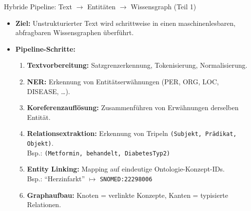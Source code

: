 \documentclass[aspectratio=1610, xcolor=dvipsnames, 9pt]{beamer}
\begin{document}
\begin{frame}{Hybride Pipeline: Text $\rightarrow$ Entitäten $\rightarrow$ Wissensgraph (Teil 1)}
  \begin{itemize}
    \item \textbf{Ziel:} Unstrukturierter Text wird schrittweise in einen maschinenlesbaren, abfragbaren Wissensgraphen überführt.
    \item \textbf{Pipeline-Schritte:}
      \begin{enumerate}
        \item \textbf{Textvorbereitung:} Satzgrenzerkennung, Tokenisierung, Normalisierung.
        \item \textbf{NER:} Erkennung von Entitätserwähnungen (PER, ORG, LOC, DISEASE, \ldots).
        \item \textbf{Koreferenzauflösung:} Zusammenführen von Erwähnungen derselben Entität.
        \item \textbf{Relationsextraktion:} Erkennung von Tripeln \texttt{(Subjekt, Prädikat, Objekt)}.\\
          Bsp.: \texttt{(Metformin, behandelt, DiabetesTyp2)}
        \item \textbf{Entity Linking:} Mapping auf eindeutige Ontologie-Konzept-IDs.\\
          Bsp.: ``Herzinfarkt'' $\mapsto$ \texttt{SNOMED:22298006}
        \item \textbf{Graphaufbau:} Knoten = verlinkte Konzepte, Kanten = typisierte Relationen.
      \end{enumerate}
  \end{itemize}
\end{frame}
\end{document}

